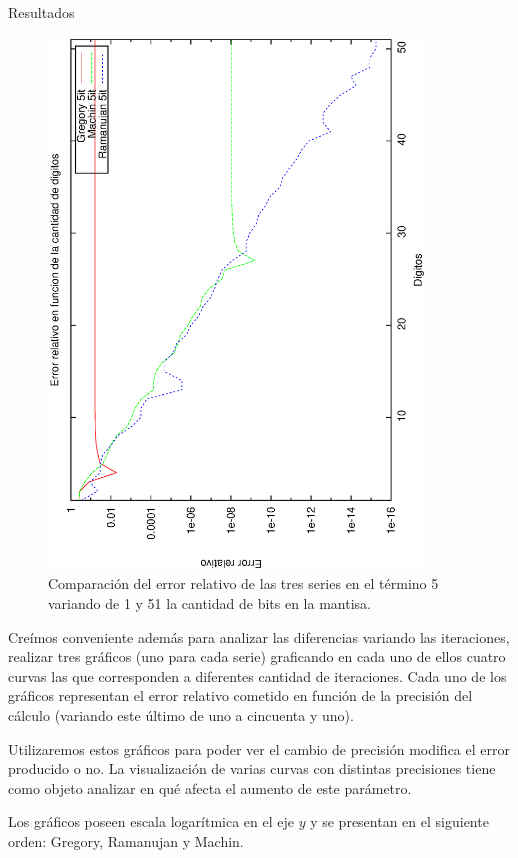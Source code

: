 \begin{section}{Resultados}
	\begin{figure}[H]
	  \centering
		\includegraphics[width=10cm,angle=-90]{graficos/comparacion_5it_1a51p.eps}
	  \caption{Comparación del error relativo de las tres series en el término 5 variando de 1 y 51 la cantidad de bits en la mantisa.}
	  \label{fig:5it}
	\end{figure}
	
	\VSP
	
	Creímos conveniente además para analizar las diferencias variando las iteraciones, realizar tres gráficos (uno para cada serie) graficando en cada uno de ellos cuatro curvas las que corresponden a diferentes cantidad de iteraciones. Cada uno de los gráficos representan el error relativo cometido en función de la precisión del cálculo (variando este último de uno a cincuenta y uno).
	
	Utilizaremos estos gráficos para poder ver el cambio de precisión modifica el error producido o no. La visualización de varias curvas con distintas precisiones tiene como objeto analizar en qué afecta el aumento de este parámetro.
	
	Los gráficos poseen escala logarítmica en el eje $y$ y se presentan en el siguiente orden: Gregory, Ramanujan y Machin.
	

\end{section}
